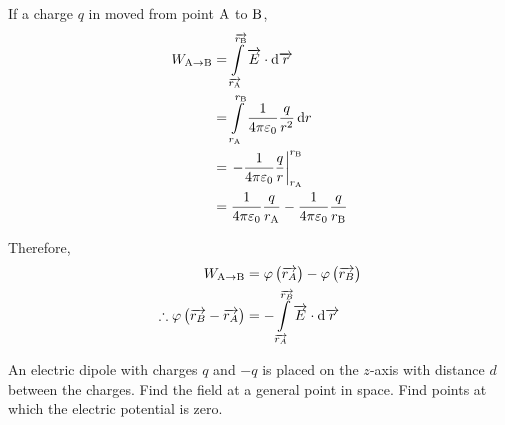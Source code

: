 \documentclass[fleqn, a4paper, 12pt, twoside]{article}
\theoremstyle{definition}
\theoremstyle{theorem}
\begin{document}
If a charge $q$ in moved from point $\textnormal{A}$ to $\textnormal{B}$,
\begin{align*}
	W_{\textnormal{\textnormal{A}} \to \textnormal{B}} &= \int\limits_{\overrightarrow{r_{\textnormal{A}}}}^{\overrightarrow{r_{\textnormal{B}}}} \overrightarrow{E} \cdot \dif \overrightarrow{r}\\
	&= \int\limits_{r_{\textnormal{A}}}^{r_{\textnormal{B}}} \dfrac{1}{4 \pi \varepsilon_0} \dfrac{q}{r^2} \dif r\\
	&= \left. - \dfrac{1}{4 \pi \varepsilon_0} \dfrac{q}{r} \right|_{r_{\textnormal{A}}}^{r_{\textnormal{B}}}\\
	&= \dfrac{1}{4 \pi \varepsilon_0} \dfrac{q}{r_{\textnormal{A}}} - \dfrac{1}{4 \pi \varepsilon_0} \dfrac{q}{r_{\textnormal{B}}}
\end{align*}

Therefore,
\begin{align*}
	W_{\textnormal{A} \to \textnormal{B}} &= \varphi \left( \overrightarrow{r_A} \right) - \varphi \left( \overrightarrow{r_B} \right)\\
	\therefore \varphi \left( \overrightarrow{r_B} - \overrightarrow{r_A} \right) &= - \int\limits_{\overrightarrow{r_A}}^{\overrightarrow{r_B}} \overrightarrow{E} \cdot \dif \overrightarrow{r}
\end{align*}

\begin{question}
	An electric dipole with charges $q$ and $-q$ is placed on the $z$-axis with distance $d$ between the charges.
	Find the field at a general point in space.
	Find points at which the electric potential is zero.
\end{question}
\end{document}
